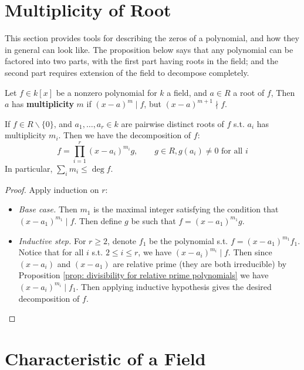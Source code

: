 \section{Multiplicity of Root}

\textstart
This section provides tools for describing the zeros of a polynomial, and how they in general can look like. The proposition below says that any polynomial can be factored into two parts, with the first part having roots in the field; and the second part requires extension of the field to decompose completely. 

\begin{definition}[Multiplicity]
    Let $f \in k[x]$ be a nonzero polynomial for $k$ a field, and $a \in R$ a root of $f$, Then $a$ has \textbf{multiplicity} $m$ if $(x - a)^m \mid f$, but $(x - a)^{m + 1} \nmid f$.
\end{definition}

\begin{proposition}
    If $f \in R \smallsetminus \{0\}$, and $a_1, \dots, a_r \in k$ are pairwise distinct roots of $f$ s.t. $a_i$ has multiplicity $m_i$. Then we have the decomposition of $f$: 
    \[
        f = \prod_{i = 1}^r (x - a_i)^{m_i} g, \qquad g \in R, \text{$g(a_i) \neq 0$ for all $i$}
    \]
    In particular, $\sum_{i} m_i \leq \deg f$.
\end{proposition}

\begin{proof}
    Apply induction on $r$: 
    \begin{itemize}
        \item \emph{Base case.} Then $m_1$ is the maximal integer satisfying the condition that $(x - a_1)^{m_1} \mid f$. Then define $g$ be such that $f = (x - a_1)^{m_1} g$. 
        \item \emph{Inductive step.} For $r \geq 2$,  denote $f_1$ be the polynomial s.t. $f = (x - a_1)^{m_1} f_1$. Notice that for all $i$ s.t. $2 \leq i \leq r$, we have $(x - a_i)^{m_i} \mid f$. Then since $(x - a_i)$ and $(x - a_1)$ are relative prime (they are both irreducible) by Proposition \ref{prop: divisibility for relative prime polynomials} we have $(x - a_i)^{m_i} \mid f_1$. Then applying inductive hypothesis gives the desired decomposition of $f$. 
    \end{itemize}
\end{proof}

\section{Characteristic of a Field}

